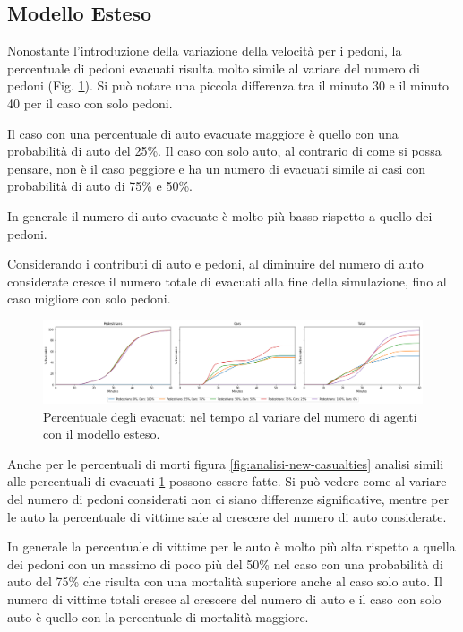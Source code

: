\pagebreak

\subsection{Modello Esteso}
Nonostante l'introduzione della variazione della velocità per i pedoni,
la percentuale di pedoni evacuati risulta molto simile al variare del numero di pedoni (Fig. \ref{fig:analisi-new-evacuated}).
Si può notare una piccola differenza tra il minuto 30 e il minuto 40 per il caso con solo pedoni.

Il caso con una percentuale di auto evacuate maggiore è quello con una probabilità di auto del 25\%.
Il caso con solo auto, al contrario di come si possa pensare, non è il caso peggiore e ha un numero di evacuati simile ai casi
con probabilità di auto di 75\% e 50\%.

In generale il numero di auto evacuate è molto più basso rispetto a quello dei pedoni.

Considerando i contributi di auto e pedoni, al diminuire del numero di auto considerate cresce il numero totale di evacuati alla fine della simulazione,
fino al caso migliore con solo pedoni.

\begin{figure}[ht]
    \centering
    \includegraphics[width=\textwidth]{images/analisi/new-evacuated.png}
    \caption{Percentuale degli evacuati nel tempo al variare del numero di agenti con il modello esteso.}
    \label{fig:analisi-new-evacuated}
\end{figure}

Anche per le percentuali di morti figura \ref{fig:analisi-new-casualties} analisi simili alle percentuali di evacuati \ref*{fig:analisi-new-evacuated}
possono essere fatte.
%
Si può vedere come al variare del numero di pedoni considerati non ci siano differenze significative,
mentre per le auto la percentuale di vittime sale al crescere del numero di auto considerate.

In generale la percentuale di vittime per le auto è molto più alta rispetto a quella dei pedoni
con un massimo di poco più del 50\% nel caso con una probabilità di auto del 75\% che risulta con una mortalità superiore anche al caso solo auto.
%
Il numero di vittime totali cresce al crescere del numero di auto e il caso con solo auto è quello con la percentuale di mortalità maggiore.

